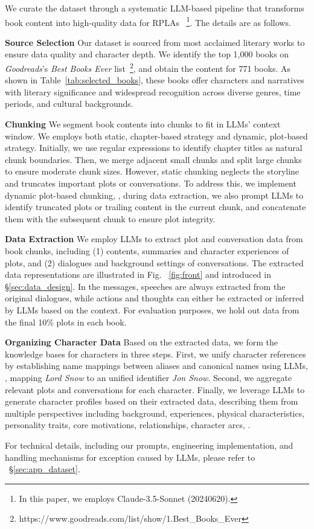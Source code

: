 We curate the \method dataset through a systematic LLM-based pipeline that transforms book content into high-quality data for RPLAs  
~\footnote{In this paper, we employs Claude-3.5-Sonnet (20240620).}. 
The details are as follows. 

\textbf{Source Selection} \quad 
Our dataset is sourced from most acclaimed literary works to ensure data quality and character depth. 
We identify the top 1,000 books on \textit{Goodreads}'s \textit{Best Books Ever} list~\footnote{https://www.goodreads.com/list/show/1.Best\_Books\_Ever}, and obtain the content for 771 books.
As shown in Table~\ref{tab:selected_books}, these books  offer characters and narratives with literary significance and widespread recognition across diverse genres, time periods, and cultural backgrounds.

\textbf{Chunking} \quad 
We segment book contents into chunks to fit in LLMs' context window. 
We employs both static, chapter-based strategy and dynamic, plot-based strategy. 
Initially, we use regular expressions to identify chapter titles as natural chunk boundaries. 
Then, we merge adjacent small chunks and split large chunks to ensure moderate chunk sizes. 
However, static chunking neglects the storyline and truncates important plots or conversations. 
To address this, we implement dynamic plot-based chunking, \ie, during data extraction, we also prompt LLMs to identify truncated plots or trailing content in the current chunk, and concatenate them with the subsequent chunk to ensure plot integrity.


\textbf{Data Extraction} \quad 
We employ LLMs to extract plot and conversation data from book chunks, including (1) contents, summaries and character experiences of plots, and (2) dialogues and background settings of conversations. 
The extracted data representations are illustrated in Fig. ~\ref{fig:front} and introduced in \S\ref{sec:data_design}. 
In the messages, speeches are always extracted from the original dialogues, while actions and thoughts can either be extracted or inferred by LLMs based on the context. 
For evaluation purposes, we hold out data from the final 10\%  plots in each book.


\textbf{Organizing Character Data} \quad 
Based on the extracted data, we form the knowledge bases for characters in three steps.  
First, we unify character references by establishing name mappings between aliases and canonical names using LLMs, \eg, mapping \textit{Lord Snow} to an unified identifier \textit{Jon Snow}. 
Second, we aggregate relevant plots and conversations for each character. 
Finally, we leverage LLMs to generate character profiles based on their extracted data, describing them from multiple perspectives including background, experiences, physical characteristics, personality traits, core motivations, relationships, character arcs, \etc. 

For technical details, including our prompts, engineering implementation, and handling mechanisms for exception caused by LLMs, please refer to ~\S\ref{sec:app_dataset}. 



